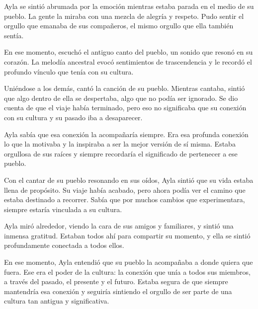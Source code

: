 

Ayla se sintió abrumada por la emoción mientras estaba parada en el medio de su pueblo. La gente la miraba con una mezcla de alegría y respeto. Pudo sentir el orgullo que emanaba de sus compañeros, el mismo orgullo que ella también sentía.

En ese momento, escuchó el antiguo canto del pueblo, un sonido que resonó en su corazón. La melodía ancestral evocó sentimientos de trascendencia y le recordó el profundo vínculo que tenía con su cultura.

Uniéndose a los demás, cantó la canción de su pueblo. Mientras cantaba, sintió que algo dentro de ella se despertaba, algo que no podía ser ignorado. Se dio cuenta de que el viaje había terminado, pero eso no significaba que su conexión con su cultura y su pasado iba a desaparecer.

Ayla sabía que esa conexión la acompañaría siempre. Era esa profunda conexión lo que la motivaba y la inspiraba a ser la mejor versión de sí misma. Estaba orgullosa de sus raíces y siempre recordaría el significado de pertenecer a ese pueblo.

Con el cantar de su pueblo resonando en sus oídos, Ayla sintió que su vida estaba llena de propósito. Su viaje había acabado, pero ahora podía ver el camino que estaba destinado a recorrer. Sabía que por muchos cambios que experimentara, siempre estaría vinculada a su cultura.

Ayla miró alrededor, viendo la cara de sus amigos y familiares, y sintió una inmensa gratitud. Estaban todos ahí para compartir su momento, y ella se sintió profundamente conectada a todos ellos.

En ese momento, Ayla entendió que su pueblo la acompañaba a donde quiera que fuera. Ese era el poder de la cultura: la conexión que unía a todos sus miembros, a través del pasado, el presente y el futuro. Estaba segura de que siempre mantendría esa conexión y seguiría sintiendo el orgullo de ser parte de una cultura tan antigua y significativa.